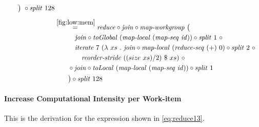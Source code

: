 \begin{align*}
\begin{aligned}
    &\qquad\big)\ \circ \splitN\ 128
  \end{aligned}\\[.5em]
%
  &\hspace{-2em}\quad\begin{aligned}
    &\overset{\ref{fig:low:mem}}{=\hspace{.2em}}
      \reduce \circ \join \circ \mapWorkgroup\ \big(\\
    &\qquad\quad \join \circ \toGlobal\ (\mapLocal\ (\mapSeq\ \id)) \circ \splitN\ 1\ \circ\\
    &\qquad\quad\iterateN\ 7\ (\lambda\ xs\ .\ \join \circ \mapLocal\ (\reduceSeq\ (+)\ 0) \circ \splitN\ 2\ \circ\\
    &\qquad\qquad \reorderStride\ ((size\ xs)/2)\ \$\ xs)\ \circ\\
    &\qquad \circ \join \circ \toLocal\ (\mapLocal\ (\mapSeq\ \id)) \circ \splitN\ 1\\
    &\qquad\big) \circ \splitN\ 128
  \end{aligned}
%  
\end{align*}

\normalsize




\paragraph{Increase Computational Intensity per Work-item}
This is the derivation for the expression shown in \autoref{eq:reduce13}.

\small


